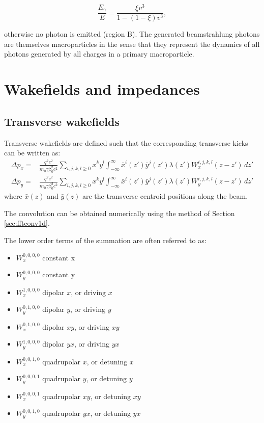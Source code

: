 \begin{equation}
\frac{E_\gamma}{E} = \frac{\xi v^3}{1 - (1 - \xi)v^3},
	\label{eq:bs_14}
\end{equation}

otherwise no photon is emitted (region B). The generated beamstrahlung photons are themselves macroparticles in the sense that they represent the dynamics of all photons generated by all charges in a primary macroparticle.
\newpage


\chapter{Wakefields and impedances}

\section{Transverse wakefields}

Transverse wakefields are defined such that the corresponding transverse kicks can be written as:
\begin{align}
    \Delta p_x = 
     & \frac{q^2 e^2}{m_0 \gamma \beta_0^2 c^2}
     \sum_{i,j,k,l \geq 0} 
        x^k y^l\int_{-\infty}^\infty
        \bar{x}^i(z')\bar{y}^j(z')\lambda(z')W^{i,j,k,l}_{x}(z - z') \, dz'
        \label{eq:wake_kick_x}\\
    \Delta p_y =
     & \frac{q^2 e^2}{m_0 \gamma \beta_0^2 c^2}
     \sum_{i,j,k,l \geq 0} 
        x^k y^l\int_{-\infty}^\infty
        \bar{x}^i(z')\bar{y}^j(z')\lambda(z')W^{i,j, k, l}_{y}(z - z') \, dz'
        \label{eq:wake_kick_y}
\end{align}
where $\bar{x}(z)$ and $\bar{y}(z)$ are the transverse centroid positions along the beam.

The convolution can be obtained numerically using the method of Section \ref{sec:fftconv1d}.



The lower order terms of the summation are often referred to as:
\begin{itemize}
    \item $W_x^{0,0,0,0}$ constant x
    \item $W_y^{0,0,0,0}$ constant y
    \item $W_x^{1,0,0,0}$ dipolar $x$, or driving $x$
    \item $W_y^{0,1,0,0}$ dipolar $y$, or driving $y$ 
    \item $W_x^{0,1,0,0}$ dipolar $xy$, or driving $xy$
    \item $W_y^{1,0,0,0}$ dipolar $yx$, or driving $yx$
    \item $W_x^{0,0,1,0}$ quadrupolar $x$, or detuning $x$
    \item $W_y^{0,0,0,1}$ quadrupolar $y$, or detuning $y$
    \item $W_x^{0,0,0,1}$ quadrupolar $xy$, or detuning $xy$
    \item $W_y^{0,0,1,0}$ quadrupolar $yx$, or detuning $yx$
\end{itemize}

